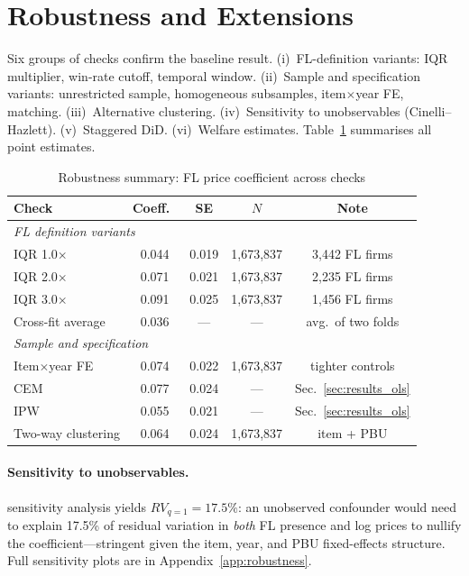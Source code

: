 
\section{Robustness and Extensions}
\label{sec:robustness}


Six groups of checks confirm the baseline result. (i)~FL-definition
variants: IQR multiplier, win-rate cutoff, temporal window.
(ii)~Sample and specification variants: unrestricted sample,
homogeneous subsamples, item$\times$year FE, matching.
(iii)~Alternative clustering. (iv)~Sensitivity to unobservables
(Cinelli--Hazlett). (v)~Staggered DiD. (vi)~Welfare estimates.
Table~\ref{tab:robustness_summary} summarises all point estimates.


\begin{table}[htbp]
\centering
\caption{Robustness summary: FL price coefficient across checks}
\label{tab:robustness_summary}
\small
\begin{tabular}{lcccc}
\hline\hline
Check & Coeff.\ & SE & $N$ & Note \\
\hline
\multicolumn{5}{l}{\textit{FL definition variants}} \\
IQR 1.0$\times$ & 0.044 & 0.019 & 1{,}673{,}837 & 3{,}442 FL firms \\
IQR 2.0$\times$ & 0.071 & 0.021 & 1{,}673{,}837 & 2{,}235 FL firms \\
IQR 3.0$\times$ & 0.091 & 0.025 & 1{,}673{,}837 & 1{,}456 FL firms \\
Cross-fit average & 0.036 & — & — & avg.\ of two folds \\
\hline
\multicolumn{5}{l}{\textit{Sample and specification}} \\
Item$\times$year FE & 0.074 & 0.022 & 1{,}673{,}837 & tighter controls \\
CEM & 0.077 & 0.024 & — & Sec.~\ref{sec:results_ols} \\
IPW & 0.055 & 0.021 & — & Sec.~\ref{sec:results_ols} \\
Two-way clustering & 0.064 & 0.024 & 1{,}673{,}837 & item + PBU \\
\hline\hline
\end{tabular}
\end{table}


\paragraph{Sensitivity to unobservables.}
\citet{cinelli2020making} sensitivity analysis yields $RV_{q=1} =
17.5\%$: an unobserved confounder would need to explain 17.5\% of
residual variation in \emph{both} FL presence and log prices to nullify
the coefficient---stringent given the item, year, and PBU fixed-effects
structure. Full sensitivity plots are in
Appendix~\ref{app:robustness}.


